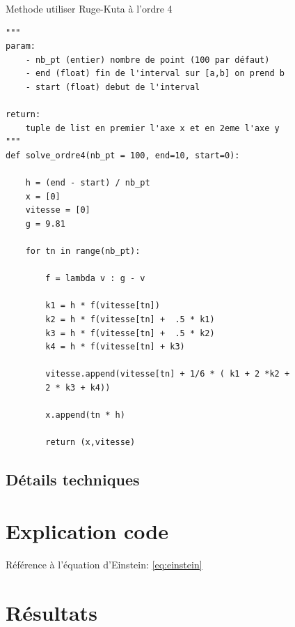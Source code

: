\documentclass[a4paper,12pt]{article}
\begin{document}
 
 
\hspace{2em}

\indent Methode utiliser Ruge-Kuta à l'ordre 4

\hspace{2em} 

\begin{verbatim}
"""
param:
	- nb_pt (entier) nombre de point (100 par défaut)
	- end (float) fin de l'interval sur [a,b] on prend b
	- start (float) debut de l'interval

return:
	tuple de list en premier l'axe x et en 2eme l'axe y	
"""
def solve_ordre4(nb_pt = 100, end=10, start=0):

    h = (end - start) / nb_pt
    x = [0]
    vitesse = [0]
    g = 9.81 

    for tn in range(nb_pt):

        f = lambda v : g - v

        k1 = h * f(vitesse[tn])
        k2 = h * f(vitesse[tn] +  .5 * k1)
        k3 = h * f(vitesse[tn] +  .5 * k2)
        k4 = h * f(vitesse[tn] + k3)

        vitesse.append(vitesse[tn] + 1/6 * ( k1 + 2 *k2 + 
        2 * k3 + k4))
        
        x.append(tn * h)
        
        return (x,vitesse)
\end{verbatim}





\subsection{Détails techniques}
\lipsum[3]






\section{Explication code}
\lipsum[4]

Référence à l'équation d'Einstein: \eqref{eq:einstein}


\section{Résultats}
\end{document}

